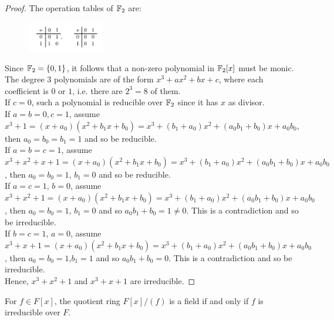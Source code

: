 \begin{proof}
    The operation tables of $\mathbb{F}_2$ are:
    \begin{figure}[H]
        \centering
        \includegraphics[width=0.3\textwidth]{figure/F_2_operator_table.png}
        \caption{}
    \end{figure}
    Since $\mathbb{F}_2=\{0,1\}$, it follows that a non-zero polynomial 
    in $\mathbb{F}_2[x]$ must be monic.
    The degree $3$ polynomials are of the form $x^3+ax^2+bx+c$,
    where each coefficient is $0$ or $1$, i.e. there are $2^3=8$ of them.\\
    If $c=0$, such a polynomial is reducible over $\mathbb{F}_2$ since it has $x$ as divisor.\\
    If $a=b=0,c=1$, assume $x^3+1=(x+a_0)(x^2+b_1x+b_0)=x^3+(b_1+a_0)x^2+(a_0b_1+b_0)x +a_0b_0$,
    then $a_0=b_0=b_1=1$ and so be reducible.\\
    If $a=b=c=1$, assume $x^3+x^2+x+1=(x+a_0)(x^2+b_1x+b_0)=x^3+(b_1+a_0)x^2+(a_0b_1+b_0)x +a_0b_0$,
    then $a_0=b_0=1$, $b_1=0$ and so be reducible.\\
    If $a=c=1$, $b=0$, assume $x^3+x^2+1=(x+a_0)(x^2+b_1x+b_0)=x^3+(b_1+a_0)x^2+(a_0b_1+b_0)x +a_0b_0$,
    then $a_0=b_0=1$, $b_1=0$ and so $a_0b_1+b_0=1\neq 0$. This is a contradiction and so be irreducible.\\
    If $b=c=1$, $a=0$, assume $x^3+x+1=(x+a_0)(x^2+b_1x+b_0)=x^3+(b_1+a_0)x^2+(a_0b_1+b_0)x +a_0b_0$,
    then $a_0=b_0=1$,$b_1=1$ and so $a_0b_1+b_0=0$. This is a contradiction and so be irreducible.\\
    Hence, $x^3+x^2+1$ and $x^3+x+1$ are irreducible.
\end{proof}

\begin{proposition}{}{}
    For $f \in F[x]$, 
    the quotient ring $F[x]/(f)$ is 
    a field if and only if 
    $f$ is irreducible over $F$.
\end{proposition}





